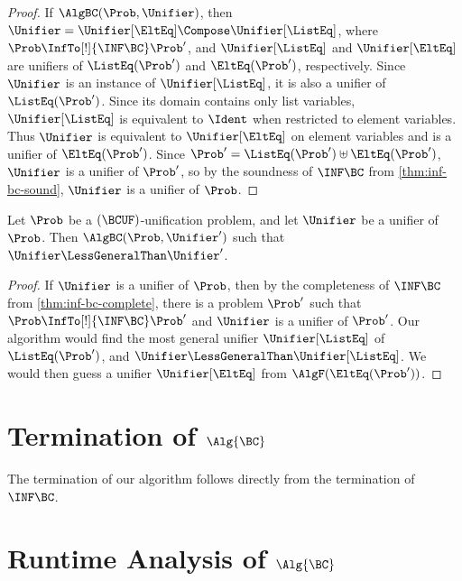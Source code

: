 \begin{proof}
    If $\AlgBC(\Prob, \Unifier)$, then $\Unifier = \Unifier[\EltEq] \Compose
    \Unifier[\ListEq]$, where $\Prob \InfTo[!]{\INF\BC} \Prob'$, and
    $\Unifier[\ListEq]$ and $\Unifier[\EltEq]$ are unifiers of
    $\ListEq(\Prob')$ and $\EltEq(\Prob')$, respectively. Since $\Unifier$ is
    an instance of $\Unifier[\ListEq]$, it is also a unifier of
    $\ListEq(\Prob')$. Since its domain contains only list variables,
    $\Unifier[\ListEq]$ is equivalent to $\Ident$ when restricted to element
    variables. Thus $\Unifier$ is equivalent to $\Unifier[\EltEq]$ on element
    variables and is a unifier of $\EltEq(\Prob')$. Since $\Prob' =
    \ListEq(\Prob') \uplus \EltEq(\Prob')$, $\Unifier$ is a unifier of
    $\Prob'$, so by the soundness of $\INF\BC$ from \cref{thm:inf-bc-sound},
    $\Unifier$ is a unifier of $\Prob$.
\end{proof}

\begin{Theorem}
    Let $\Prob$ be a $(\BCUF)$-unification problem, and let $\Unifier$ be a
    unifier of $\Prob$. Then $\AlgBC(\Prob, \Unifier')$ such that $\Unifier
    \LessGeneralThan \Unifier'$.
\end{Theorem}

\begin{proof}
    If $\Unifier$ is a unifier of $\Prob$, then by the completeness of
    $\INF\BC$ from \cref{thm:inf-bc-complete}, there is a problem $\Prob'$ such
    that $\Prob \InfTo[!]{\INF\BC} \Prob'$ and $\Unifier$ is a unifier of
    $\Prob'$. Our algorithm would find the most general unifier
    $\Unifier[\ListEq]$ of $\ListEq(\Prob')$, and $\Unifier \LessGeneralThan
    \Unifier[\ListEq]$. We would then guess a unifier $\Unifier[\EltEq]$ from
    $\AlgF(\EltEq(\Prob'))$.
\end{proof}


\section{Termination of $\Alg{\BC}$}\label{sec:bc-termination}

The termination of our algorithm follows directly from the termination of
$\INF\BC$.

\section{Runtime Analysis of $\Alg{\BC}$}\label{sec:bc-runtime-analysis}

